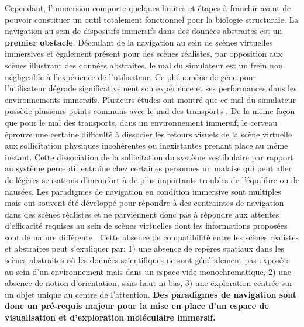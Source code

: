 Cependant, l'immersion comporte quelques limites et étapes à franchir avant de pouvoir constituer un outil totalement fonctionnel pour la biologie structurale. 
La navigation au sein de dispositifs immersifs dans des données abstraites est un \textbf{premier obstacle}. Découlant de la navigation au sein de scènes virtuelles immersives et également présent pour des scènes réalistes, par opposition aux scènes illustrant des données abstraites, le mal du simulateur est un frein non négligeable à l'expérience de l'utilisateur. Ce phénomène de gène pour l'utilisateur dégrade significativement son expérience et ses performances dans les environnements immersifs. Plusieurs études ont montré que ce mal du simulateur possède plusieurs points communs avec le mal des transports \cite{laviola_jr_discussion_2000}. De la même façon que pour le mal des transports, dans un environnement immersif, le cerveau éprouve une certaine difficulté à dissocier les retours visuels de la scène virtuelle aux sollicitation physiques incohérentes ou inexistantes prenant place au même instant. Cette dissociation de la sollicitation du système vestibulaire par rapport au système perceptif \cite{reason1975motion} entraîne chez certaines personnes un malaise qui peut aller de légères sensations d'inconfort à de plus importants troubles de l'équilibre ou de nausées. Les paradigmes de navigation en condition immersive sont multiples mais ont souvent été développé pour répondre à des contraintes de navigation dans des scènes réalistes et ne parviennent donc pas à répondre aux attentes d'efficacité requises au sein de scènes virtuelles dont les informations proposées sont de nature différente \cite{trellet_content-guided_2014}. Cette absence de compatibilité entre les scènes réalistes et abstraites peut s'expliquer par: 1) une absence de repères spatiaux dans les scènes abstraites où les données scientifiques ne sont généralement pas exposées au sein d'un environnement mais dans un espace vide monochromatique, 2) une absence de notion d'orientation, sans haut ni bas, 3) une exploration centrée sur un objet unique au centre de l'attention. 
\textbf{Des paradigmes de navigation sont donc un pré-requis majeur pour la mise en place d'un espace de visualisation et d'exploration moléculaire immersif.}

